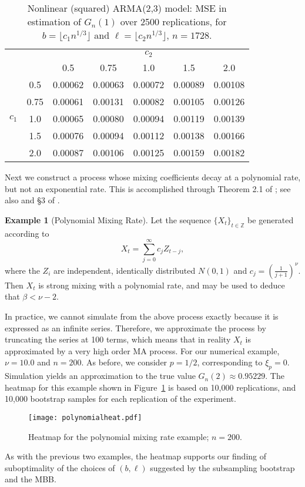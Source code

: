 \documentclass[a4paper, 12pt]{article}
\theoremstyle{plain}
\theoremstyle{definition}
\newtheorem{example}{Example}
\begin{document}
\begin{table}[h]
\caption{\label{tab:adaptive1728}
Nonlinear (squared) ARMA(2,3) model: MSE in estimation of $G_n(1)$ over 2500 replications, for $b= \lfloor c_{1}n^{1/3} \rfloor $ and $\ell= \lfloor c_{2}n^{1/3} \rfloor$, $n=1728$.}
\centering
\begin{tabular}{c c | c c c c c}
&&&&$c_2$&&\\ 
&&0.5&0.75&1.0&1.5&2.0 \\
\hline
 &0.5& 0.00062&  0.00063&  0.00072&  0.00089&  0.00108 \\
 &0.75& 0.00061& 0.00131& 0.00082&  0.00105&  0.00126 \\
 $c_1$& 1.0& 0.00065& 0.00080&  0.00094&  0.00119&  0.00139 \\
 &1.5& 0.00076&  0.00094& 0.00112&  0.00138&  0.00166 \\
 &2.0& 0.00087& 0.00106&  0.00125& 0.00159&  0.00182 \\
\hline

\end{tabular}
\end{table}

Next we construct a process whose mixing coefficients decay at a polynomial rate, but not an exponential rate. This is accomplished through Theorem 2.1 of \citet{Chanda:1974}; see also \citet{Bandyopadhyay:2006} and \S 3 of \citet{CSWX:2016}.
\begin{example}[Polynomial Mixing Rate]
Let the sequence $\{X_{t}\}_{t \in \mathbb{Z}}$ be generated according to
\[
X_{t}=\sum_{j=0}^{\infty}c_{j}Z_{t-j},
\]
where the $Z_{i}$ are independent, identically distributed $N(0,1)$ and $c_{j}=(\tfrac{1}{j+1})^{\nu}$. Then $X_{t}$ is strong mixing with a polynomial rate, and \citet{Chanda:1974} may be used to deduce that $\beta<\nu-2$.

\end{example}
In practice, we cannot simulate from the above process exactly because it is expressed as an infinite series. Therefore, we approximate the process by truncating the series at 100 terms, which means that in reality $X_{t}$ is approximated by a very high order MA process. For our numerical example, $\nu=10.0$ and $n=200$. As before, we consider $p=1/2$, corresponding to $\xi_{p}=0$. Simulation yields an approximation to the true value $G_{n}(2) \approx 0.95229$. The heatmap for this example shown in Figure~\ref{polynomialheat} is based on 10,000 replications, and 10,000 bootstrap samples for each replication of the experiment.
\begin{figure}[htp]
\centering
\caption{\label{polynomialheat}
Heatmap for the polynomial mixing rate example; $n=200$.}
\texttt{[image: polynomialheat.pdf]}
\end{figure}
As with the previous two examples, the heatmap supports our finding of suboptimality of the choices of $(b,\ell)$ suggested by the subsampling bootstrap and the MBB.
\end{document}
